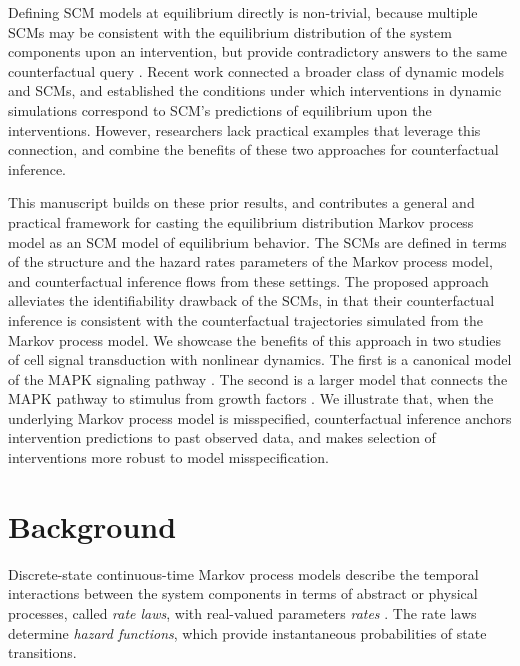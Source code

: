 \documentclass{article}
\begin{document}
Defining SCM models at equilibrium directly is non-trivial, because multiple SCMs may be consistent with the equilibrium distribution of the system components upon an intervention, but provide contradictory answers to the same counterfactual query \cite{pearl2009causal, peters2017elements}. Recent work \cite{bongers2018random, mooij2013ordinary, blombeyond} connected a broader class of dynamic models and SCMs, and established the conditions under which interventions in dynamic simulations correspond to SCM's  predictions of equilibrium upon the interventions. However, researchers lack practical examples that leverage this connection, and combine the benefits of these two approaches for counterfactual inference.


This manuscript builds on these prior results, and contributes a general and practical framework for casting the equilibrium distribution Markov process model as an SCM model of equilibrium behavior. The SCMs are defined in terms of the structure and the hazard rates parameters of the Markov process model, and counterfactual inference flows from these settings. The proposed approach alleviates the identifiability drawback of the SCMs, in that their counterfactual inference is consistent with the counterfactual trajectories simulated from the Markov process model. We showcase the benefits of this approach in two studies of cell signal transduction with nonlinear dynamics. The first is a canonical model of the MAPK signaling pathway \cite{KIM2010396}. The second is a larger model that connects the MAPK pathway to stimulus from growth factors \cite{BIANCONI2012142}. We illustrate that, when the underlying Markov process model is misspecified, counterfactual inference anchors intervention predictions to past observed data, and makes selection of interventions more robust to model misspecification.



\vspace{-3mm}
\section{Background}
\vspace{-2mm}
 Discrete-state continuous-time Markov process models describe the temporal interactions between the system components in terms of abstract or physical processes, called {\it rate laws}, with real-valued parameters {\it rates} \cite{Ecological}.  The rate laws determine {\it hazard functions}, which provide instantaneous probabilities of state transitions.
\end{document}

